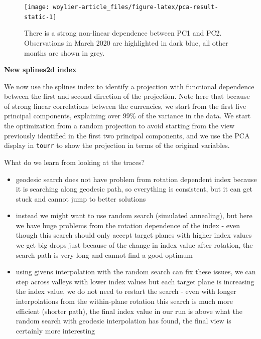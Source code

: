 \begin{figure}

{\centering \texttt{[image: woylier-article\_files/figure-latex/pca-result-static-1]} 

}

\caption{There is a strong non-linear dependence between PC1 and PC2. Observations in March 2020 are highlighted in dark blue, all other months are shown in grey.}\label{fig:pca-result-static}
\end{figure}

\textbf{New splines2d index}

We now use the splines index to identify a projection with functional dependence between the first and second direction of the projection. Note here that because of strong linear correlations between the currencies, we start from the first five principal components, explaining over 99\% of the variance in the data. We start the optimization from a random projection to avoid starting from the view previously identified in the first two principal components, and we use the PCA display in \texttt{tourr} to show the projection in terms of the original variables.

What do we learn from looking at the traces?

\begin{itemize}
\tightlist
\item
  geodesic search does not have problem from rotation dependent index because it is searching along geodesic path, so everything is consistent, but it can get stuck and cannot jump to better solutions
\item
  instead we might want to use random search (simulated annealing), but here we have huge problems from the rotation dependence of the index - even though this search should only accept target planes with higher index values we get big drops just because of the change in index value after rotation, the search path is very long and cannot find a good optimum
\item
  using givens interpolation with the random search can fix these issues, we can step across valleys with lower index values but each target plane is increasing the index value, we do not need to restart the search - even with longer interpolations from the within-plane rotation this search is much more efficient (shorter path), the final index value in our run is above what the random search with geodesic interpolation has found, the final view is certainly more interesting
\end{itemize}

